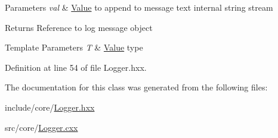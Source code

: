 \begin{DoxyParams}{Parameters}
{\em val} & \mbox{\hyperlink{classeven_1_1_value}{Value}} to append to message text internal string stream \\
\hline
\end{DoxyParams}
\begin{DoxyReturn}{Returns}
Reference to log message object 
\end{DoxyReturn}

\begin{DoxyTemplParams}{Template Parameters}
{\em T} & \mbox{\hyperlink{classeven_1_1_value}{Value}} type \\
\hline
\end{DoxyTemplParams}


Definition at line 54 of file Logger.\+hxx.



The documentation for this class was generated from the following files\+:\begin{DoxyCompactItemize}
\item 
include/core/\mbox{\hyperlink{_logger_8hxx}{Logger.\+hxx}}\item 
src/core/\mbox{\hyperlink{_logger_8cxx}{Logger.\+cxx}}\end{DoxyCompactItemize}
